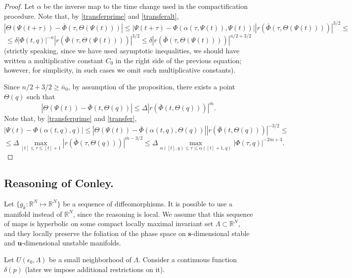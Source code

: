 \documentclass[11pt]{article}
\theoremstyle{Mystyle}
\begin{document}
\begin{proof}
Let $\alpha$ be the inverse map to the time change used in the compactification procedure.
Note that, by \eqref{transferprime} and \eqref{transferalt},
$$|\Theta(\Psi(t+\tau)) - \bar{\Phi}(\tau,\Theta(\Psi(t)))|\leq
|\Psi(t+\tau) - \Phi(\alpha(\tau,\Psi(t)),\Psi(t))||r(\bar{\Phi}(\tau,\Theta(\Psi(t))))|^{3/2}\leq$$
$$\leq \delta|\Phi(t,q)|^{-n}|r(\bar{\Phi}(\tau,\Theta(\Psi(t))))|^{3/2}\leq
\delta |r(\bar{\Phi}(\tau,\Theta(\Psi(t))))|^{n/2+3/2}$$
(strictly speaking, since we have used asymptotic inequalities, we should have written a multiplicative constant $C_0$ in the right side of the previous equation; however, for simplicity, in such cases we omit such multiplicative constants).

Since $n/2+3/2\geq\bar{n}_0$, by assumption of the proposition, there exists a point $\Theta(q)$ such that
$$|\Theta(\Psi(t)) - \bar{\Phi}(t,\Theta(q))|\leq 
\Delta|r(\bar{\Phi}(t,\Theta(q)))|^{\bar{m}}.$$
Note that, by \eqref{transferprime} and \eqref{transfer},
$$|\Psi(t) - \Phi(\alpha(t,q),q)|\leq |\Theta(\Psi(t)) - \bar{\Phi}(\alpha(t,q),\Theta(q))||r(\bar{\Phi}(t,\Theta(q)))|^{-3/2}\leq$$
$$\leq \Delta\max_{[t]\leq \tau\leq [t]+1}|r(\bar{\Phi}(\tau,\Theta(q)))|^{\bar{m}-3/2}\leq
\Delta\max_{\alpha([t],q)\leq \tau\leq \alpha([t]+1,q)}|\Phi(\tau,q)|^{-2\bar{m}+3}.$$
\end{proof}

\subsection{Reasoning of Conley.}

Let $\{g_k:\mathbb{R}^N\mapsto \mathbb{R}^N\}$ be a sequence of diffeomorphisms.
It is possible to use a manifold instead of $\mathbb{R}^{N}$, since the reasoning is local.
We assume that this sequence of maps is hyperbolic on some compact locally maximal invariant set $\Lambda\subset \mathbb{R}^N$, and they locally preserve the foliation of the phase space on $\textbf{s}$-dimensional stable and $\textbf{u}$-dimensional unstable manifolds. 

Let $U(\epsilon_0,\Lambda)$ be a small neighborhood of $\Lambda$. 
Consider a continuous function $\delta(p)$ (later we impose additional restrictions on it).
\end{document}
